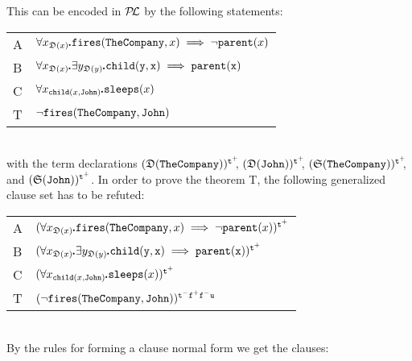 \documentclass{\filespath jancl}
\makeatletter
\newcommand\COMP{{\tt TheCompany}}
\def\sdot{\rule{.3ex}{.3ex}\hspace{-0.4ex}\;}
\newcommand{\Defined}{{\mathfrak D}}
\newcommand{\Secure}{{\mathfrak S}}
\newcommand{\undefined}{{\tt u}}
\newcommand{\twts}{{{\tt t}^+}}
\newcommand{\twfs}{{{\tt f}^+}}
\newcommand{\twti}{{{\tt t}^-}}
\newcommand{\twfi}{{{\tt f}^-}}
\def\presuppl{{\cal P\kern-.4ex L}}
\def\impl{\implies}\def\non{\neg}
\newcommand{\all}[3]{\forall {#1}_{#2}\sdot #3}
\newcommand{\ex}[3]{\exists {#1}_{#2}\sdot #3}
\newcommand{\bd}{\begin{tabular}{l@{$\;\;$}l}}
\newcommand{\ed}{\end{tabular}}
\makeatother
\begin{document}
\def\somespace{0.9ex}
This can be encoded in $\presuppl$ by the following statements:\\[\somespace]
\hspace*{2ex}\begin{minipage}[t]{0.7\textwidth}
\bd
A & $\all{x}{\Defined(x)}{{\tt fires}(\COMP,x)\impl \non {\tt parent}(x)}$\\
B & $\all{x}{\Defined(x)}{\ex{y}{{\Defined(y)}} {\tt child}(y,x)\impl{\tt parent}(x)}$\\
C & $\all{x}{{\tt child}(x,{\tt John})}{{\tt sleeps}(x)}$\\[1ex]

T & $\non {\tt fires}{(\COMP,{\tt John})}$
\ed
\end{minipage}\\[\somespace]
with the term declarations $(\Defined(\COMP))^\twts\!\!$,
$(\Defined({\tt John}))^\twts\!\!$, $(\Secure(\COMP))^\twts\!\!$, and
$(\Secure({\tt John}))^\twts$.
In order to prove the theorem T, the following generalized clause set
has to be refuted:\\[\somespace]
\hspace*{2ex}\begin{minipage}[t]{0.7\textwidth}
\bd
A & $(\all{x}{\Defined(x)}{{\tt fires}(\COMP,x)\impl \non {\tt parent}(x)})^\twts$\\
B & $(\all{x}{\Defined(x)}{\ex{y}{{\Defined(y)}} {\tt child}(y,x)}\impl{\tt parent}(x))^\twts$\\
C & $(\all{x}{{\tt child}(x,{\tt John})}{{\tt sleeps}(x)})^\twts$\\[1ex]

T & $(\non {\tt fires}{(\COMP,{\tt John})})^{\twti\twfs\twfi\undefined}$
\ed
\end{minipage}\\[\somespace]
By the rules for forming a clause normal form we get the clauses:\\[\somespace]
\hspace*{2ex}
\end{document}
